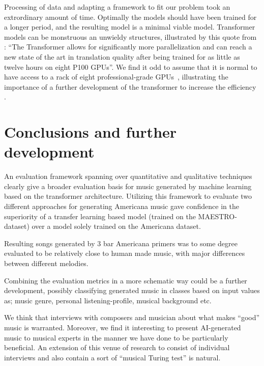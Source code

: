 \documentclass{IEEEtran}
\begin{document}
Processing of data and adapting a framework to fit our problem 
took an extrordinary amount of time. Optimally the models should have been
trained for a longer period, and the resulting model is a minimal viable model.
Transformer models can be monstruous 
an unwieldy structures, illustrated by this quote from
\citeauthor{vaswani2017attention}: ``The Transformer allows for significantly
more parallelization and can reach a new state of the art in translation
quality after being trained for as little as twelve hours on eight P100 GPUs''.
We find it odd to assume that it is normal to have access to a rack of eight 
professional-grade GPUs~\cite{vaswani2017attention}, illustrating the importance
of a further development of the transformer to increase the efficiency 
\cite{kitaev2020reformer}.

\section{Conclusions and further development}
An evaluation framework spanning over quantitative and qualitative techniques
clearly give a broader evaluation basis for music generated by machine learning 
based on the transformer architecture. Utilizing this framework to evaluate two different 
approaches for generating Americana music gave confidence in the superiority of a 
transfer learning based model (trained on the MAESTRO-dataset) over a model solely
trained on the Americana dataset.

Resulting songs generated by 3 bar Americana primers was to some degree evaluated to 
be relatively close to human made music, with major differences between different melodies.

Combining the evaluation metrics in a more schematic way could be a further development, 
possibly classifying generated music in classes based on input values as; music genre, personal listening-profile, musical background etc.

We think that interviews with composers and musician about what makes ``good'' music 
is warranted. Moreover, we find it interesting to present AI-generated 
music to musical experts in the manner we have done to be particularly beneficial.
An extension of this venue of research to consist of individual interviews
and also contain a sort of ``musical Turing test'' is natural.


\vspace{3em}

\printbibliography
\end{document}
